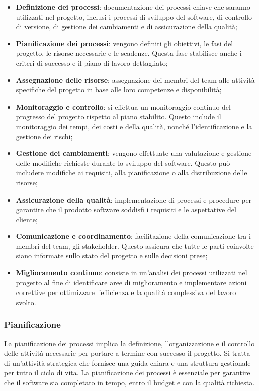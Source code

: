 \begin{itemize}
    \item \textbf{Definizione dei processi}: documentazione dei processi chiave che saranno utilizzati nel progetto, inclusi i processi di sviluppo del software, di controllo di versione, di gestione dei cambiamenti e di assicurazione della qualità;
    \item \textbf{Pianificazione dei processi}: vengono definiti gli obiettivi, le fasi del progetto, le risorse necessarie e le scadenze. Questa fase stabilisce anche i criteri di successo e il piano di lavoro dettagliato;
    \item \textbf{Assegnazione delle risorse}: assegnazione dei membri del team alle attività specifiche del progetto in base alle loro competenze e disponibilità;
    \item \textbf{Monitoraggio e controllo}: si effettua un monitoraggio continuo del progresso del progetto rispetto al piano stabilito. Questo include il monitoraggio dei tempi, dei costi e della qualità, nonché l'identificazione e la gestione dei rischi;
    \item \textbf{Gestione dei cambiamenti}: vengono effettuate una valutazione e gestione delle modifiche richieste durante lo sviluppo del software. Questo può includere modifiche ai requisiti, alla pianificazione o alla distribuzione delle risorse;
    \item \textbf{Assicurazione della qualità}: implementazione di processi e procedure per garantire che il prodotto software soddisfi i requisiti e le aspettative del cliente;
    \item \textbf{Comunicazione e coordinamento}: facilitazione della comunicazione tra i membri del team, gli stakeholder. Questo assicura che tutte le parti coinvolte siano informate sullo stato del progetto e sulle decisioni prese;
    \item \textbf{Miglioramento continuo}: consiste in un'analisi dei processi utilizzati nel progetto al fine di identificare aree di miglioramento e implementare azioni correttive per ottimizzare l'efficienza e la qualità complessiva del lavoro svolto.
\end{itemize}

\subsubsection{Pianificazione}
La pianificazione dei processi implica la definizione, l'organizzazione e il controllo delle attività necessarie per portare a termine con successo il progetto. Si tratta di un'attività strategica che fornisce una guida chiara e una struttura gestionale per tutto il ciclo di vita. La pianificazione dei processi è essenziale per garantire che il software sia completato in tempo, entro il budget e con la qualità richiesta.


